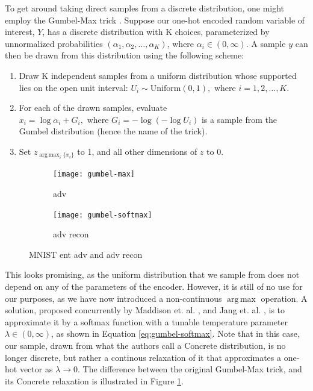 \documentclass{report}
\DeclareMathOperator*{\argmax}{arg\,max}
\begin{document}
\noindent To get around taking direct samples from a discrete distribution, one might employ the Gumbel-Max trick \cite{Luce59}. Suppose our one-hot encoded random variable of interest, $Y$, has a discrete distribution with K choices, parameterized by unnormalized probabilities $(\alpha_1, \alpha_2, \dots, \alpha_K)$, where $\alpha_i \in (0, \infty)$. A sample $y$ can then be drawn from this distribution using the following scheme:

\begin{enumerate}
  \item Draw K independent samples from a uniform distribution whose supported lies on the open unit interval: $U_i \sim \text{Uniform}(0, 1), \text{ where } i = 1, 2, \dots, K$.
  \item For each of the drawn samples, evaluate $x_i = \log \alpha_i + G_i, \text{ where } G_i = -\log(-\log U_i)$ is a sample from the Gumbel distribution (hence the name of the trick).
  \item Set $z_{\argmax_i \{x_i\}}$ to 1, and all other dimensions of $z$ to 0.
\end{enumerate}

\begin{figure}
\begin{subfigure}{.5\textwidth}
  \centering
  \texttt{[image: gumbel-max]}
  \caption{adv}
\end{subfigure}%
\begin{subfigure}{.5\textwidth}
  \centering
  \texttt{[image: gumbel-softmax]}
  \caption{adv recon}
\end{subfigure}
\caption{MNIST ent adv and adv recon}
\label{fig:concrete}
\end{figure}


\bigskip

\noindent This looks promising, as the uniform distribution that we sample from does not depend on any of the parameters of the encoder. However, it is still of no use for our purposes, as we have now introduced a non-continuous $\argmax$ operation. A solution, proposed concurrently by Maddison et. al. \cite{concrete}, and Jang et. al. \cite{gumbel-softmax}, is to approximate it by a softmax function with a tunable temperature parameter $\lambda \in (0, \infty)$, as shown in Equation \ref{eq:gumbel-softmax}. Note that in this case, our sample, drawn from what the authors call a Concrete distribution, is no longer discrete, but rather a continous relaxation of it that approximates a one-hot vector as $\lambda \rightarrow 0$. The difference between the original Gumbel-Max trick, and its Concrete relaxation is illustrated in Figure \ref{fig:concrete}.
\end{document}
